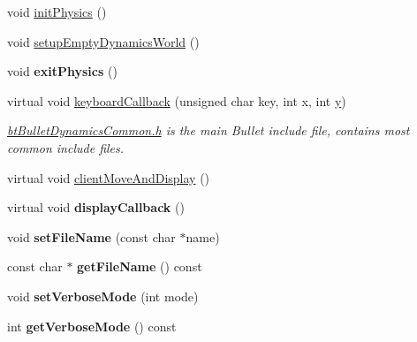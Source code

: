 \begin{DoxyCompactItemize}
\item 
void \hyperlink{class_serialize_demo_ae6388e6881b98bcc3c2aa1d9f8b4ba2d}{init\+Physics} ()
\item 
void \hyperlink{class_serialize_demo_ada1ad68e6aee119f5ddf7750b7badf09}{setup\+Empty\+Dynamics\+World} ()
\item 
\hypertarget{class_serialize_demo_ae00ee132614297a599b2aeacce5f73b1}{void {\bfseries exit\+Physics} ()}\label{class_serialize_demo_ae00ee132614297a599b2aeacce5f73b1}

\item 
\hypertarget{class_serialize_demo_a2e24e5db495ece1df96a5332defd071e}{virtual void \hyperlink{class_serialize_demo_a2e24e5db495ece1df96a5332defd071e}{keyboard\+Callback} (unsigned char key, int x, int \hyperlink{_ice_utils_8h_aa7ffaed69623192258fb8679569ff9ba}{y})}\label{class_serialize_demo_a2e24e5db495ece1df96a5332defd071e}

\begin{DoxyCompactList}\small\item\em \hyperlink{bt_bullet_dynamics_common_8h_source}{bt\+Bullet\+Dynamics\+Common.\+h} is the main Bullet include file, contains most common include files. \end{DoxyCompactList}\item 
virtual void \hyperlink{class_serialize_demo_ac8598cc586f9b2f0e8b85dae7193485e}{client\+Move\+And\+Display} ()
\item 
\hypertarget{class_serialize_demo_a5bdf21f102c275d55a49010c776e59b1}{virtual void {\bfseries display\+Callback} ()}\label{class_serialize_demo_a5bdf21f102c275d55a49010c776e59b1}

\item 
\hypertarget{class_serialize_demo_ab4be2e63c9a16b81bdb31db5d6677f6f}{void {\bfseries set\+File\+Name} (const char $\ast$name)}\label{class_serialize_demo_ab4be2e63c9a16b81bdb31db5d6677f6f}

\item 
\hypertarget{class_serialize_demo_a06bf97f7a29b593065dc547bf014c50b}{const char $\ast$ {\bfseries get\+File\+Name} () const }\label{class_serialize_demo_a06bf97f7a29b593065dc547bf014c50b}

\item 
\hypertarget{class_serialize_demo_adb742ae17a5b547c5da40a729a752375}{void {\bfseries set\+Verbose\+Mode} (int mode)}\label{class_serialize_demo_adb742ae17a5b547c5da40a729a752375}

\item 
\hypertarget{class_serialize_demo_a0f3e53867eddcea6ec7f3d52fa3a40b0}{int {\bfseries get\+Verbose\+Mode} () const }\label{class_serialize_demo_a0f3e53867eddcea6ec7f3d52fa3a40b0}

\end{DoxyCompactItemize}
